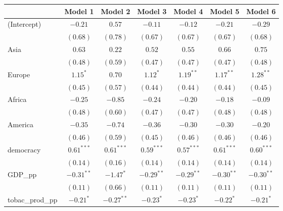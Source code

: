 
\begin{table}[!h]
\begin{center}
\begin{tabular}{l c c c c c c }
\toprule
 & Model 1 & Model 2 & Model 3 & Model 4 & Model 5 & Model 6 \\
\midrule
(Intercept)             & $-0.21$      & $0.57$       & $-0.11$      & $-0.12$      & $-0.21$      & $-0.29$      \\
                        & $(0.68)$     & $(0.78)$     & $(0.67)$     & $(0.67)$     & $(0.67)$     & $(0.68)$     \\
Asia                    & $0.63$       & $0.22$       & $0.52$       & $0.55$       & $0.66$       & $0.75$       \\
                        & $(0.48)$     & $(0.59)$     & $(0.47)$     & $(0.47)$     & $(0.47)$     & $(0.48)$     \\
Europe                  & $1.15^{*}$   & $0.70$       & $1.12^{*}$   & $1.19^{**}$  & $1.17^{**}$  & $1.28^{**}$  \\
                        & $(0.45)$     & $(0.57)$     & $(0.44)$     & $(0.44)$     & $(0.44)$     & $(0.45)$     \\
Africa                  & $-0.25$      & $-0.85$      & $-0.24$      & $-0.20$      & $-0.18$      & $-0.09$      \\
                        & $(0.48)$     & $(0.60)$     & $(0.47)$     & $(0.47)$     & $(0.48)$     & $(0.48)$     \\
America                 & $-0.35$      & $-0.74$      & $-0.36$      & $-0.30$      & $-0.30$      & $-0.20$      \\
                        & $(0.46)$     & $(0.59)$     & $(0.45)$     & $(0.46)$     & $(0.46)$     & $(0.46)$     \\
democracy               & $0.61^{***}$ & $0.61^{***}$ & $0.59^{***}$ & $0.57^{***}$ & $0.61^{***}$ & $0.60^{***}$ \\
                        & $(0.14)$     & $(0.16)$     & $(0.14)$     & $(0.14)$     & $(0.14)$     & $(0.14)$     \\
GDP\_pp                 & $-0.31^{**}$ & $-1.47^{*}$  & $-0.29^{**}$ & $-0.29^{**}$ & $-0.30^{**}$ & $-0.30^{**}$ \\
                        & $(0.11)$     & $(0.66)$     & $(0.11)$     & $(0.11)$     & $(0.11)$     & $(0.11)$     \\
tobac\_prod\_pp         & $-0.21^{*}$  & $-0.27^{**}$ & $-0.23^{*}$  & $-0.23^{*}$  & $-0.22^{*}$  & $-0.21^{*}$  \\

\end{tabular}
\end{center}
\end{table}
